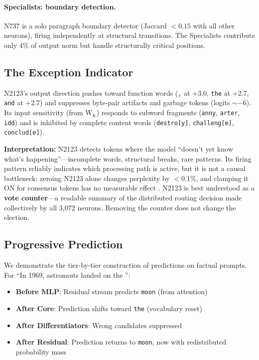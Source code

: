 \documentclass{article}
\begin{document}
\paragraph{Specialists: boundary detection.}
N737 is a solo paragraph boundary detector (Jaccard $< 0.15$ with all other
neurons), firing independently at structural transitions.
The Specialists contribute only 4\% of output norm but handle structurally
critical positions.

\subsection{The Exception Indicator}

N2123's output direction pushes toward function words
(\texttt{,} at +3.0, \texttt{the} at +2.7, \texttt{and} at +2.7)
and suppresses byte-pair artifacts and garbage tokens (logits $\sim -6$).
Its input sensitivity (from W$_\text{fc}$) responds to subword fragments
(\texttt{anny}, \texttt{arter}, \texttt{idd}) and is inhibited by complete
content words (\texttt{destro[y]}, \texttt{challeng[e]}, \texttt{conclud[e]}).

\textbf{Interpretation:} N2123 detects tokens where the model ``doesn't yet know
what's happening''---incomplete words, structural breaks, rare patterns.
Its firing pattern reliably indicates which processing path is active, but
it is not a causal bottleneck: zeroing N2123 alone changes perplexity by
$<$0.1\%, and clamping it ON for consensus tokens has no measurable effect
\citep{balogh2026discrete}.
N2123 is best understood as a \textbf{vote counter}---a readable summary of
the distributed routing decision made collectively by all 3,072 neurons.
Removing the counter does not change the election.

\subsection{Progressive Prediction}

We demonstrate the tier-by-tier construction of predictions on factual prompts.
For ``In 1969, astronauts landed on the \underline{\hspace{1cm}}'':

\begin{itemize}
\item \textbf{Before MLP}: Residual stream predicts \texttt{moon} (from attention)
\item \textbf{After Core}: Prediction shifts toward \texttt{the} (vocabulary reset)
\item \textbf{After Differentiators}: Wrong candidates suppressed
\item \textbf{After Residual}: Prediction returns to \texttt{moon}, now with
redistributed probability mass
\end{itemize}
\end{document}
